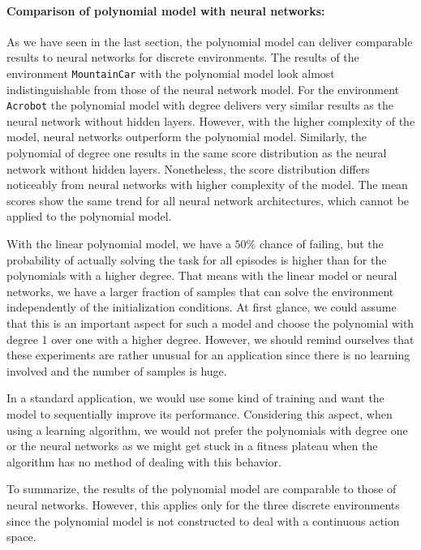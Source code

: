 \paragraph*{Comparison of polynomial model with neural networks:} As we have seen in the last section, the polynomial model can deliver comparable results to neural networks for discrete environments. The results of the environment \texttt{MountainCar} with the polynomial model look almost indistinguishable from those of the neural network model. For the environment \texttt{Acrobot} the polynomial model with degree delivers very similar results as the neural network without hidden layers. However, with the higher complexity of the model, neural networks outperform the polynomial model. Similarly, the polynomial of degree one results in the same score distribution as the neural network without hidden layers. Nonetheless, the score distribution differs noticeably from neural networks with higher complexity of the model. The mean scores show the same trend for all neural network architectures, which cannot be applied to the polynomial model.

With the linear polynomial model, we have a $50 \%$ chance of failing, but the probability of actually solving the task for all episodes is higher than for the polynomials with a higher degree. That means with the linear model or neural networks, we have a larger fraction of samples that can solve the environment independently of the initialization conditions. At first glance, we could assume that this is an important aspect for such a model and choose the polynomial with degree 1 over one with a higher degree. However, we should remind ourselves that these experiments are rather unusual for an application since there is no learning involved and the number of samples is huge.

In a standard application, we would use some kind of training and want the model to sequentially improve its performance. Considering this aspect, when using a learning algorithm, we would not prefer the polynomials with degree one or the neural networks as we might get stuck in a fitness plateau when the algorithm has no method of dealing with this behavior.

To summarize, the results of the polynomial model are comparable to those of neural networks. However, this applies only for the three discrete environments since the polynomial model is not constructed to deal with a continuous action space.

